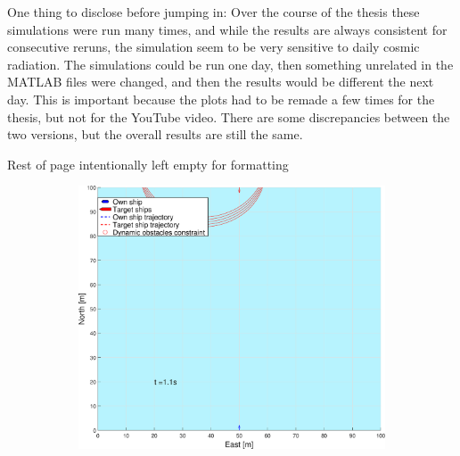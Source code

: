 One thing to disclose before jumping in: Over the course of the thesis these simulations were run many times, and while the results are always consistent
for consecutive reruns, the simulation seem to be very sensitive to daily cosmic radiation. The simulations could be run one day, then something unrelated in the
MATLAB files were changed, and then the results would be different the next day. This is important because the plots had to be remade a few times for the
thesis, but not for the YouTube video. There are some discrepancies between the two versions, but the overall results are still the same.

\vfill
Rest of page intentionally left empty for formatting
\vfill 

\clearpage
\begin{figure}[ht!] %
    \begin{subfigure}[b]{0.49\textwidth}
        \centering
        \includegraphics[width=\textwidth]{Images/Figures/enkel_HO/_Simple_0fig1_time=1}

\end{subfigure}
\end{figure}
